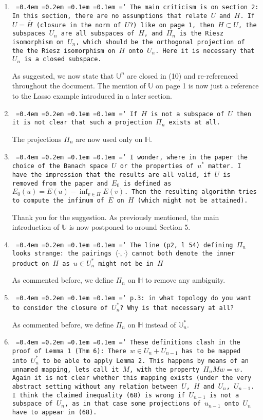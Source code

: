 \documentclass[12pt]{article}
\newcommand*\justify{%
	\fontdimen2\font=0.4em%
	\fontdimen3\font=0.2em%
	\fontdimen4\font=0.1em%
	\fontdimen7\font=0.1em%
	\hyphenchar\font=`\-%
}
\newcommand{\review}[1]{\texttt{\justify{#1}}}
\newcommand{\F}[1]{\mathbb{#1}}
\begin{document}
\begin{enumerate}
	\item \review{The main criticism is on section 2: In this section, there are no assumptions that relate $U$ and $H$. If $U=\bar{H}$ (closure in the norm of $U$?) like on page 1, then $H\subset U$, the subspaces $U_n$ are all subspaces of $H$, and $\Pi_n$ is the Riesz isomorphism on $U_n$, which should be the orthogonal projection of the the Riesz isomorphism on $H$ onto $U_n$. Here it is necessary that $U_n$ is a closed subspace.}
	
	As suggested, we now state that $\F U^n$ are closed in (10) and re-referenced throughout the document. The mention of $\F U$ on page 1 is now just a reference to the Lasso example introduced in a later section.
	
	\item \review{If $H$ is not a subspace of $U$ then it is not clear that such a projection $\Pi_n$ exists at all.}
	
	The projections $\Pi_n$ are now used only on $\F H$.
	
	\item \review{I wonder, where in the paper the choice of the Banach space $U$ or the properties of $u^*$ matter. I have the impression that the results are all valid, if $U$ is removed from the paper and $E_0$ is defined as $E_0(u)=E(u)-\inf_{v\in H}E(v)$. Then the resulting algorithm tries to compute the infimum of $E$ on $H$ (which might not be attained).}
	
	Thank you for the suggestion. As previously mentioned, the main introduction of $\F U$ is now postponed to around Section 5.
	
	\item \review{The line (p2, l 54) defining $\Pi_n$ looks strange: the pairings $\langle\cdot,\cdot\rangle$ cannot both denote the inner product on $H$ as $u\in U_n^*$ might not be in $H$}

	As commented before, we define $\Pi_n$ on $\F H$ to remove any ambiguity.
	
	\item \review{p.3: in what topology do you want to consider the closure of $U_n^*$? Why is that necessary at all?}
	
	As commented before, we define $\Pi_n$ on $\F H$ instead of $\F U_n^*$.	
	
	\item \review{These definitions clash in the proof of Lemma 1 (Thm 6): There $w\in U_n+U_{n-1}$ has to be mapped into $U_n^*$ to be able to apply Lemma 2. This happens by means of an unnamed mapping, lets call it $M$, with the property $\Pi_nMw=w$. Again it is not clear whether this mapping exists (under the very abstract setting without any relation between $U$, $H$ and $U_n$, $U_{n-1}$. I think the claimed inequality (68) is wrong if $U_{n-1}$ is not a subspace of $U_n$, as in that case some projections of $u_{n-1}$ onto $U_n$ have to appear in (68).}
	

\end{enumerate}
\end{document}
